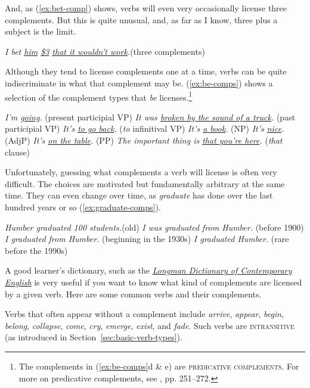 \noindent And, as (\ref{ex:bet-comp}) shows, verbs will even very occasionally license three complements. But this is quite unusual, and, as far as I know, three plus a subject is the limit.

\ea\label{ex:bet-comp}
\ea \textit{I bet \uline{him} \uline{\$3} \uline{that it wouldn't work}.}\hfill(three complements)
\z\z

Although they tend to license complements one at a time, verbs can be quite indiscriminate in what that complement may be. (\ref{ex:be-comps}) shows a selection of the complement types that \textit{be} licenses.\footnote{The complements in (\ref{ex:be-comps}d \& e) are \textsc{predicative complements}. For more on predicative complements, see \citet{Huddleston2002}, pp. 251--272.}

\ea\label{ex:be-comps}
\ea \textit{I'm \uline{going}.} \hfill (present participial VP)
\ex \textit{It was \uline{broken by the sound of a truck}.} \hfill (past participial VP)
\ex \textit{It's \uline{to go back}.} \hfill (\textit{to} infinitival VP)
\ex \textit{It's \uline{a book}.} \hfill (NP)
\ex \textit{It's \uline{nice}.} \hfill (AdjP)
\ex \textit{It's \uline{on the table}.} \hfill (PP)
\ex \textit{The important thing is \uline{that you're here}.} \hfill (\textit{that} clause)
\z
\z

Unfortunately, guessing what complements a verb will license is often very difficult. The choices are motivated but fundamentally arbitrary at the same time. They can even change over time, as \textit{graduate} has done over the last hundred years or so (\ref{ex:graduate-comps}).

\ea\label{ex:graduate-comps}
\ea \textit{Humber graduated 100 students.}\hfill(old)
\ex \textit{I was graduated from Humber.}	\hfill(before 1900)
\ex \textit{I graduated from Humber.} 	\hfill(beginning in the 1930s)
\ex \textit{I graduated Humber.} 	\hfill(rare before the 1990s)
\z\z

A good learner's dictionary, such as the \textit{\href{https://www.ldoceonline.com/}{Longman Dictionary of Contemporary English}} is very useful if you want to know what kind of complements are licensed by a given verb. Here are some common verbs and their complements.

Verbs that often appear without a complement include \textit{arrive}, \textit{appear}, \textit{begin}, \textit{belong}, \textit{collapse}, \textit{come}, \textit{cry}, \textit{emerge}, \textit{exist}, and \textit{fade}. Such verbs are \textsc{intransitive} (as introduced in Section~\ref{sec:basic-verb-types}).

